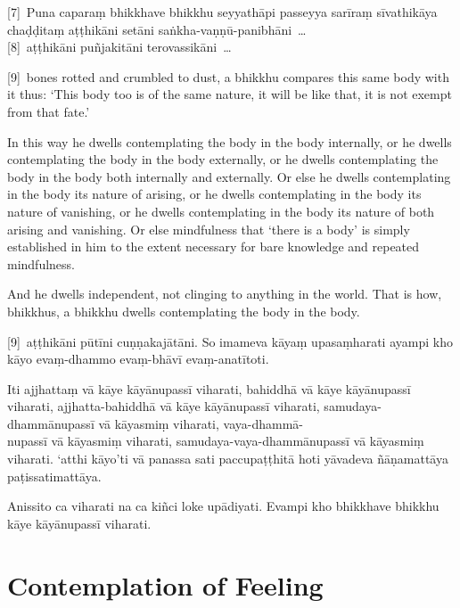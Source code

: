 [7]~Puna caparaṃ bhikkhave bhikkhu seyyathāpi passeyya sarīraṃ sīvathikāya chaḍḍitaṃ
aṭṭhikāni setāni saṅkha-vaṇṇū-panibhāni~\ldots{}\\
{}[8]~aṭṭhikāni puñjakitāni terovassikāni~\ldots{}

\englishPage

[9]~bones rotted and crumbled to dust, a bhikkhu compares this same
body with it thus: ‘This body too is of the same nature, it will be like that,
it is not exempt from that fate.’

In this way he dwells contemplating the body in the body internally, or he
dwells contemplating the body in the body externally, or he dwells contemplating
the body in the body both internally and externally. Or else he dwells
contemplating in the body its nature of arising, or he dwells contemplating in
the body its nature of vanishing, or he dwells contemplating in the body its
nature of both arising and vanishing. Or else mindfulness that ‘there is a body’
is simply established in him to the extent necessary for bare knowledge and
repeated mindfulness.

And he dwells independent, not clinging to anything in the world. That is how,
bhikkhus, a bhikkhu dwells contemplating the body in the body.



\paliPage

[9]~aṭṭhikāni pūtīni cuṇṇakajātāni. So imameva kāyaṃ
upasaṃharati ayampi kho kāyo evaṃ-dhammo evaṃ-bhāvī evaṃ-anatītoti.

Iti ajjhattaṃ vā kāye kāyānupassī viharati, bahiddhā vā kāye kāyānupassī
viharati, ajjhatta-bahiddhā vā kāye kāyānupassī viharati, samudaya-dhammānupassī
vā kāyasmiṃ viharati, vaya-dhammā-\\
nupassī vā kāyasmiṃ viharati, samudaya-vaya-dhammānupassī vā kāyasmiṃ viharati.
`atthi kāyo'ti vā panassa sati paccupaṭṭhitā hoti yāvadeva ñāṇamattāya
paṭissatimattāya.

Anissito ca viharati na ca kiñci loke upādiyati. Evampi kho bhikkhave bhikkhu
kāye kāyānupassī viharati.



\englishPage
\chapter{Contemplation of Feeling}

